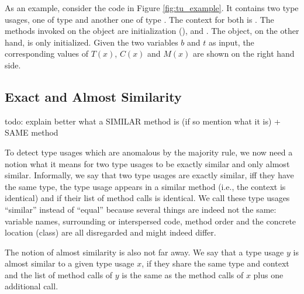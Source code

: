 As an example, consider the code in Figure \ref{fig:tu_example}.
It contains two type usages, one of type  and another one of type .
The context for both is .
The methods invoked on the  object are initialization (),  and .
The  object, on the other hand, is only initialized.
Given the two variables $b$ and $t$ as input, the corresponding values of $T(x)$, $C(x)$ and $M(x)$ are shown on the right hand side.

\subsection{Exact and Almost Similarity}

todo: explain better what a SIMILAR method is (if so mention what it is) + SAME method 

To detect type usages which are anomalous by the majority rule, we now need a notion what it means for two type usages to be exactly similar and only almost similar.
Informally, we say that two type usages are exactly similar, iff they have the same type, the type usage appears in a similar method (i.e., the context is identical) and if their list of method calls is identical.
We call these type usages ``similar'' instead of ``equal'' because several things are indeed not the same: variable names, surrounding or interspersed code, method order and the concrete location (class) are all disregarded and might indeed differ.

The notion of almost similarity is also not far away.
We say that a type usage $y$ is almost similar to a given type usage $x$, if they share the same type and context and the list of method calls of $y$ is the same as the method calls of $x$ plus one additional call.

